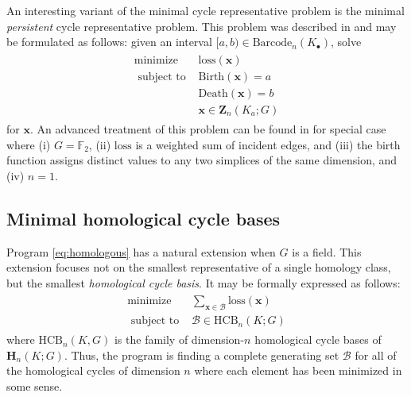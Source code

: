 \documentclass[11pt,onecolumn]{article}
\newcommand{\field}{\mathbb{F}}
\newcommand{\Homologies}[0]{\mathbf{H}}
\newcommand{\Cycles}[0]{\mathbf{Z}}
\newcommand{\optimalrep}{\mathbf{x}}
\newcommand{\birth}{\mathrm{Birth}}
\newcommand{\death}{\mathrm{Death}}
\newcommand{\barcode}{\mathrm{Barcode}}
\newcommand{\loss}{\mathrm{loss}}
\newcommand{\setofhcyclebases}{\mathrm{HCB}}
\newcommand{\pr}{Program }
\newcommand{\hcyclebasis}{\mathcal B}
\theoremstyle{plain}
\theoremstyle{definition}
\begin{document}
An interesting variant of the minimal cycle representative problem is the minimal \emph{persistent} cycle representative problem.  This problem was described in  \cite{chenquantifying} and may be formulated as follows:  given an interval $[a,b) \in \barcode_n(K_\bullet)$, solve 
\begin{align}
   \begin{split}
    \text{minimize } & \loss(\optimalrep) \\
    \text{ subject to } & \birth(\optimalrep) = a \\
    & \death(\optimalrep) = b \\
    & \optimalrep \in \Cycles_n(K_a; G)
   \end{split}
   \label{eq:minbarcoderep}
\end{align}
for $\optimalrep$.  An advanced treatment of this problem can be found in \cite{chenquantifying} for special case where (i)  $G = \field_2$, (ii) $\loss$ is a weighted sum of incident edges,  and (iii) the birth function assigns distinct values to any two simplices of the same dimension, and (iv) $n=1$.  


\subsection{Minimal homological cycle bases}

\pr \eqref{eq:homologous} has a natural extension when $G$ is a field.  This extension focuses not on the smallest representative of a single homology class, but the smallest  \emph{homological cycle basis}.  It may be formally expressed as follows:
\begin{align}
   \begin{split}
    \text{minimize } & \textstyle \sum_{\optimalrep \in \hcyclebasis} \loss(\optimalrep) \\
    \text{ subject to } & \hcyclebasis \in \setofhcyclebases_n(K ; G)
   \end{split}
   \label{eq:generalminimalbasis}
\end{align}
where $\setofhcyclebases_n(K, G)$ is the family of dimension-$n$ homological cycle bases of $\Homologies_n(K;G)$. Thus, the program is finding a complete generating set $\hcyclebasis$ for all of the homological cycles of dimension $n$ where each element has been minimized in some sense.  
\end{document}
